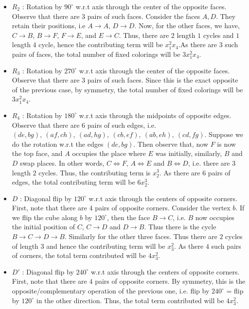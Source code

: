 {\begin{itemize}
\item $R_2$ : Rotation by $90^{\circ}$ w.r.t axis through the center of the opposite faces. Observe that there are $3$ pairs of such faces. Consider the faces $A, D$. They retain their positions, i.e $A \rightarrow A$, $D \rightarrow D$. Now, for the other faces, we have, $C \rightarrow B$, $B \rightarrow F$, $F \rightarrow E$, and $E \rightarrow C$. Thus, there are $2$ length $1$ cycles and $1$ length $4$ cycle, hence the contributing term will be $x_1^2x_4$.As there are $3$ such pairs of faces, the total number of fixed colorings will be $\boxed{3x_1^2x_4}$.

\item $R_3$ : Rotation by $270^{\circ}$ w.r.t axis through the center of the opposite faces. Observe that there are $3$ pairs of such faces. Since this is the exact opposite of the previous case, by symmetry, the total number of fixed colorings will be $\boxed{3x_1^2x_4}$.

\item $R_4$ : Rotation by $180^{\circ}$ w.r.t axis through the midpoints of opposite edges. Observe that there are $6$ pairs of such edges, i.e. $(de, bg),\ (af, ch),\ (ad, hg),\ (cb, ef),\ (ab, eh),\ (cd, fg)$. Suppose we do the rotation w.r.t the edges $(de, bg)$. Then observe that, now $F$ is now the top face, and $A$ occupies the place where $E$ was initially, similarly, $B$ and $D$ swap places. In other words, $C \iff F$, $A \iff E$ and $B \iff D$, i.e. there are $3$ length $2$ cycles. Thus, the contributing term is $x_2^3$. As there are $6$ pairs of edges, the total contributing term will be $\boxed{6 x_2^3}$.

\item $D$ : Diagonal flip by $120^{\circ}$ w.r.t axis through the centers of opposite corners. First, note that there are $4$ pairs of opposite corners. 
Consider the vertex $b$. If we flip the cube along $b$ by $120^{\circ}$, then the face $B \rightarrow C$, i.e. $B$ now occupies the initial position of $C$, $C \rightarrow D$ and $D \rightarrow B$. Thus there is the cycle $B \rightarrow C \rightarrow D \rightarrow B$. Similarly for the other three faces. Thus there are $2$ cycles of length $3$ and hence the contributing term will be $x_3^2$. As there $4$ such pairs of corners, the total term contributed will be $\boxed{4x_3^2}$.

\item $D'$ : Diagonal flip by $240^{\circ}$ w.r.t axis through the centers of opposite corners. First, note that there are $4$ pairs of opposite corners. By symmetry, this is the opposite/complementary operation of the previous one, i.e. flip by $240^{\circ}$ = flip by $120^{\circ}$ in the other direction. Thus, the total term contributed will be $\boxed{4x_3^2}$.
\end{itemize}

}
